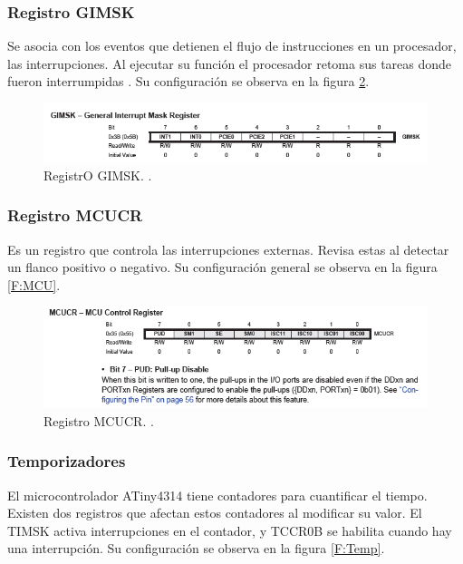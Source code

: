 \documentclass[12pt,letterpaper]{article}     %
\begin{document}
\subsubsection{Registro GIMSK}
Se asocia con los eventos que detienen el flujo de instrucciones en un procesador, las interrupciones. Al ejecutar su funci\'on el procesador retoma sus tareas donde fueron interrumpidas \cite{Microchip}. Su configuraci\'on se observa en la figura \ref{F:GIM}.

\begin{figure}[H]
    \centering
    \includegraphics[width=1.0\textwidth]{imagenes/6.PNG}
    \caption{RegistrO GIMSK. \cite{Microchip}.}
    \label{F:GIM}
    \end{figure}

\subsubsection{Registro MCUCR}
Es un registro que controla las interrupciones externas. Revisa estas al detectar un flanco positivo o negativo. Su configuraci\'on general se observa en la figura \ref{F:MCU}.

\begin{figure}[H]
    \centering
    \includegraphics[width=1.0\textwidth]{imagenes/7.PNG}
    \caption{Registro MCUCR. \cite{Microchip}.}
    \label{F:GIM}
    \end{figure}


\subsubsection{Temporizadores}
El microcontrolador ATiny4314 tiene contadores para cuantificar el tiempo. Existen dos registros que afectan estos contadores al modificar su valor. El TIMSK activa interrupciones en el contador, y TCCR0B se habilita cuando hay una interrupci\'on. Su configuraci\'on se observa en la figura \ref{F:Temp}.
\end{document}
